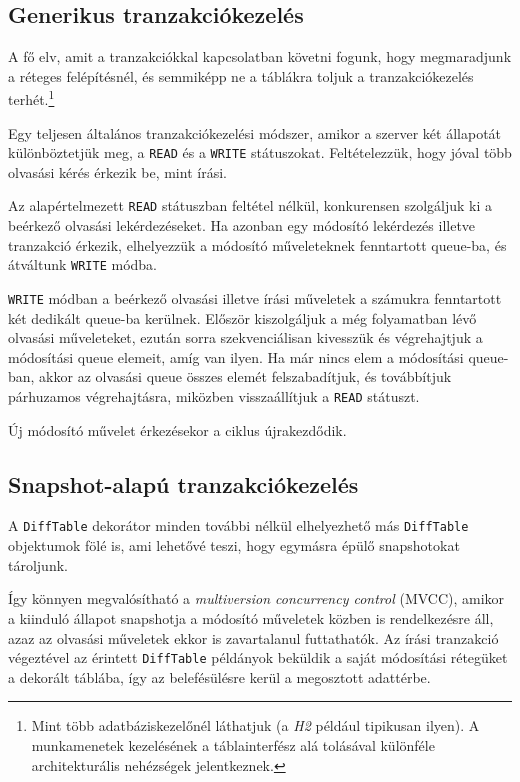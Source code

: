 \documentclass[
    parspace,
    noindent,
    nohyp,
]{elteiktdk}[2023/04/10]
\begin{document}
\subsection{Generikus tranzakciókezelés}

A fő elv, amit a tranzakciókkal kapcsolatban követni fogunk,
hogy megmaradjunk a réteges felépítésnél,
és semmiképp ne a táblákra toljuk a tranzakciókezelés terhét.\footnote{
    Mint több adatbáziskezelőnél láthatjuk (a \textit{H2} például tipikusan ilyen).
    A munkamenetek kezelésének a táblainterfész alá tolásával
    különféle architekturális nehézségek jelentkeznek.
}

Egy teljesen általános tranzakciókezelési módszer,
amikor a szerver két állapotát különböztetjük meg,
a \texttt{READ} és a \texttt{WRITE} státuszokat.
Feltételezzük, hogy jóval több olvasási kérés érkezik be, mint írási.

Az alapértelmezett \texttt{READ} státuszban feltétel nélkül,
konkurensen szolgáljuk ki a beérkező olvasási lekérdezéseket.
Ha azonban egy módosító lekérdezés illetve tranzakció érkezik,
elhelyezzük a módosító műveleteknek fenntartott queue-ba,
és átváltunk \texttt{WRITE} módba.

\texttt{WRITE} módban a beérkező olvasási illetve írási műveletek
a számukra fenntartott két dedikált queue-ba kerülnek.
Először kiszolgáljuk a még folyamatban lévő olvasási műveleteket,
ezután sorra szekvenciálisan kivesszük és végrehajtjuk a módosítási queue elemeit, amíg van ilyen.
Ha már nincs elem a módosítási queue-ban,
akkor az olvasási queue összes elemét felszabadítjuk, és továbbítjuk párhuzamos végrehajtásra,
miközben visszaállítjuk a \texttt{READ} státuszt.

Új módosító művelet érkezésekor a ciklus újrakezdődik.

\subsection{Snapshot-alapú tranzakciókezelés}

A \texttt{DiffTable} dekorátor minden további nélkül elhelyezhető
más \texttt{DiffTable} objektumok fölé is, ami lehetővé teszi, hogy egymásra épülő snapshotokat tároljunk.

Így könnyen megvalósítható a \textit{multiversion concurrency control} (MVCC),
amikor a kiinduló állapot snapshotja a módosító műveletek közben is rendelkezésre áll,
azaz az olvasási műveletek ekkor is zavartalanul futtathatók.
Az írási tranzakció végeztével az érintett \texttt{DiffTable} példányok
beküldik a saját módosítási rétegüket a dekorált táblába,
így az belefésülésre kerül a megosztott adattérbe.
\end{document}

